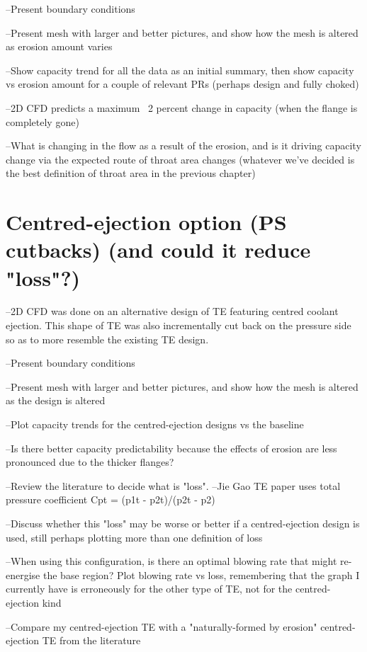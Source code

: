 \documentclass[11pt, twoside]{report}
\begin{document}
--Present boundary conditions

--Present mesh with larger and better pictures, and show how the mesh is altered as erosion amount varies

--Show capacity trend for all the data as an initial summary, then show capacity vs erosion amount for a couple of relevant PRs (perhaps design and fully choked)

--2D CFD predicts a maximum ~2 percent change in capacity (when the flange is completely gone)

--What is changing in the flow as a result of the erosion, and is it driving capacity change via the expected route of throat area changes (whatever we've decided is the best definition of throat area in the previous chapter)


\section{Centred-ejection option (PS cutbacks) (and could it reduce "loss"?)}

--2D CFD was done on an alternative design of TE featuring centred coolant ejection. This shape of TE was also incrementally cut back on the pressure side so as to more resemble the existing TE design.

--Present boundary conditions

--Present mesh with larger and better pictures, and show how the mesh is altered as the design is altered

--Plot capacity trends for the centred-ejection designs vs the baseline

--Is there better capacity predictability because the effects of erosion are less pronounced due to the thicker flanges?

--Review the literature to decide what is "loss".
 --Jie Gao TE paper uses total pressure coefficient Cpt = (p1t - p2t)/(p2t - p2)

--Discuss whether this "loss" may be worse or better if a centred-ejection design is used, still perhaps plotting more than one definition of loss

--When using this configuration, is there an optimal blowing rate that might re-energise the base region? Plot blowing rate vs loss, remembering that the graph I currently have is erroneously for the other type of TE, not for the centred-ejection kind

--Compare my centred-ejection TE with a "naturally-formed by erosion" centred-ejection TE from the literature 
\end{document}
